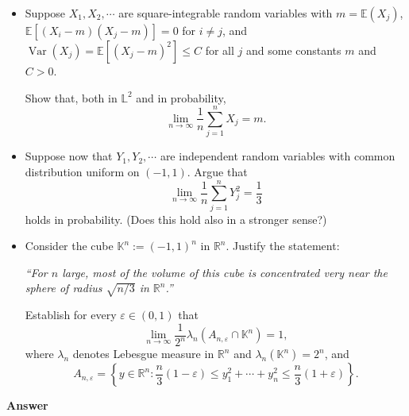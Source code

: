 \documentclass[letterpaper]{article}
\begin{document}
			\begin{itemize}
				
				\item[(i)] Suppose $X_1,X_2,\cdots$ are square-integrable random variables with
				$m=\mathbb{E}(X_j)$,
				$\mathbb{E}[(X_i-m)(X_j-m)]=0$ for $i\ne j$, and
				$\operatorname{Var}(X_j)=\mathbb{E}[(X_j-m)^2]\le C$
				for all $j$ and some constants $m$ and $C>0$.
				
				Show that, both in $\mathbb{L}^2$ and in probability,
				\[
				\lim_{n\to\infty}\frac{1}{n}\sum_{j=1}^n X_j = m.
				\]
				
				\item[(ii)] Suppose now that $Y_1,Y_2,\cdots$ are independent random variables with
				common distribution uniform on $(-1,1)$.
				Argue that
				\[
				\lim_{n\to\infty}\frac{1}{n}\sum_{j=1}^n Y_j^2=\frac{1}{3}
				\]
				holds in probability. (Does this hold also in a stronger sense?)
				
				\item[(iii)] Consider the cube $\mathbb{K}^n := (-1,1)^n$ in $\mathbb{R}^n$.
				Justify the statement:
				
				\emph{``For $n$ large, most of the volume of this cube is concentrated very
					near the sphere of radius $\sqrt{n/3}$ in $\mathbb{R}^n$.''}
				
				Establish for every $\varepsilon\in(0,1)$ that
				\[
				\lim_{n\to\infty}
				\frac{1}{2^n}\lambda_n\!\left(A_{n,\varepsilon}\cap\mathbb{K}^n\right)=1,
				\]
				where $\lambda_n$ denotes Lebesgue measure in $\mathbb{R}^n$ and
				$\lambda_n(\mathbb{K}^n)=2^n$, and
				\[
				A_{n,\varepsilon}
				=
				\left\{
				y\in\mathbb{R}^n:
				\frac{n}{3}(1-\varepsilon)
				\le
				y_1^2+\cdots+y_n^2
				\le
				\frac{n}{3}(1+\varepsilon)
				\right\}.
				\]
				
			\end{itemize}
		
		\textbf{Answer} 
		
		
	
\end{document}

